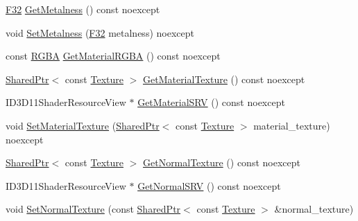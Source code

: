 \begin{DoxyCompactItemize}
\item 
\hyperlink{namespacemage_aa97e833b45f06d60a0a9c4fc22ae02c0}{F32} \hyperlink{classmage_1_1_material_a9d91ff9ce999d24558305f070d0cde93}{Get\+Metalness} () const noexcept
\item 
void \hyperlink{classmage_1_1_material_a70dde310b2108e9ad3041df13db0bdc0}{Set\+Metalness} (\hyperlink{namespacemage_aa97e833b45f06d60a0a9c4fc22ae02c0}{F32} metalness) noexcept
\item 
const \hyperlink{structmage_1_1_r_g_b_a}{R\+G\+BA} \hyperlink{classmage_1_1_material_a58b1f3d253b1a6d8541bc9a954e6fc1d}{Get\+Material\+R\+G\+BA} () const noexcept
\item 
\hyperlink{namespacemage_a1e01ae66713838a7a67d30e44c67703e}{Shared\+Ptr}$<$ const \hyperlink{classmage_1_1_texture}{Texture} $>$ \hyperlink{classmage_1_1_material_aa8accf832423420f6b2ed4b50ef394b3}{Get\+Material\+Texture} () const noexcept
\item 
I\+D3\+D11\+Shader\+Resource\+View $\ast$ \hyperlink{classmage_1_1_material_a0675c4bbbdb48c0db9bf82fffb073094}{Get\+Material\+S\+RV} () const noexcept
\item 
void \hyperlink{classmage_1_1_material_a48f5f4576a998f8015b96f41e6c6c870}{Set\+Material\+Texture} (\hyperlink{namespacemage_a1e01ae66713838a7a67d30e44c67703e}{Shared\+Ptr}$<$ const \hyperlink{classmage_1_1_texture}{Texture} $>$ material\+\_\+texture) noexcept
\item 
\hyperlink{namespacemage_a1e01ae66713838a7a67d30e44c67703e}{Shared\+Ptr}$<$ const \hyperlink{classmage_1_1_texture}{Texture} $>$ \hyperlink{classmage_1_1_material_a41a286cf05a2627ee0baef602b01a1fb}{Get\+Normal\+Texture} () const noexcept
\item 
I\+D3\+D11\+Shader\+Resource\+View $\ast$ \hyperlink{classmage_1_1_material_a0be98911c56dedaa4fd2f8714fc8a793}{Get\+Normal\+S\+RV} () const noexcept
\item 
void \hyperlink{classmage_1_1_material_a178b5b945137d7aab35db01a2e52ab31}{Set\+Normal\+Texture} (const \hyperlink{namespacemage_a1e01ae66713838a7a67d30e44c67703e}{Shared\+Ptr}$<$ const \hyperlink{classmage_1_1_texture}{Texture} $>$ \&normal\+\_\+texture)
\end{DoxyCompactItemize}
